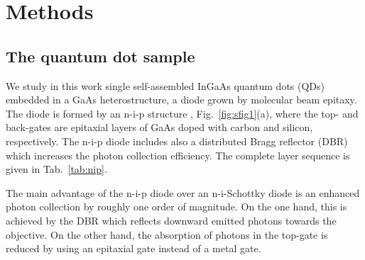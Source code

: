 \documentclass[aps,prl,reprint,superscriptaddress]{revtex4-1}
\newcommand{\beginsupplement}{%
        \setcounter{table}{0}
        \renewcommand{\thetable}{S\arabic{table}}%
        \setcounter{figure}{0}
        \renewcommand{\thefigure}{S\arabic{figure}}%
     }
\begin{document}
\author{Richard J.\ Warburton}



\date{\today}


\pacs{}%

\maketitle %


\beginsupplement

\section{Methods}

\subsection{The quantum dot sample}
We study in this work single self-assembled InGaAs quantum dots (QDs) embedded in a GaAs heterostructure, a diode grown by molecular beam epitaxy. The diode is formed by an n-i-p structure \cite{Prechtel2016}, Fig.\ \ref{fig:sfig1}(a), where the top- and back-gates are epitaxial layers of GaAs doped with carbon and silicon, respectively. The n-i-p diode includes also a distributed Bragg reflector (DBR) which increases the photon collection efficiency. The complete layer sequence is given in Tab.\ \ref{tab:nip}.

The main advantage of the n-i-p diode over an n-i-Schottky diode is an enhanced photon collection by roughly one order of magnitude. On the one hand, this is achieved by the DBR which reflects downward emitted photons towards the objective. On the other hand, the absorption of photons in the top-gate is reduced by using an epitaxial gate instead of a metal gate. 
\end{document}
